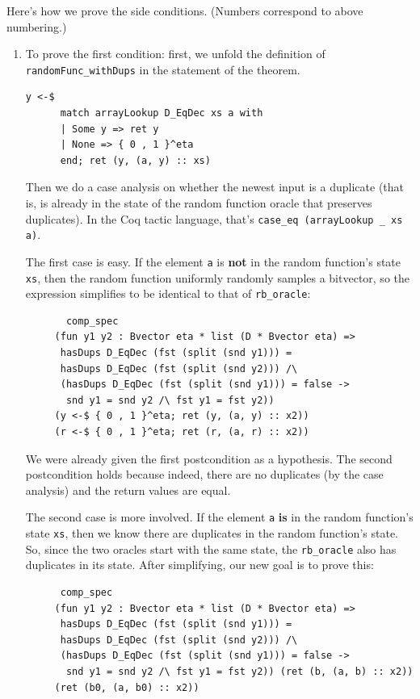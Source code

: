 \documentclass[12pt,lot, lof]{puthesis}
\newcommand{\li} {\lstinline}
\begin{document}
{Here's how we prove the side conditions. (Numbers correspond to above numbering.) 

\begin{enumerate}
\item To prove the first condition: first, we unfold the definition of \li|randomFunc_withDups| in the statement of the theorem.

\begin{lstlisting}
y <-$
      match arrayLookup D_EqDec xs a with
      | Some y => ret y
      | None => { 0 , 1 }^eta
      end; ret (y, (a, y) :: xs)
\end{lstlisting}      

Then we do a case analysis on whether the newest input is a duplicate (that is, is already in the state of the random function oracle that preserves duplicates). In the Coq tactic language, that's \li|case_eq (arrayLookup _ xs a)|.

	The first case is easy. If the element \li|a| is \textbf{not} in the random function's state \li|xs|, then the random function uniformly randomly samples a bitvector, so the expression simplifies to be identical to that of \li|rb_oracle|:
	
	\begin{lstlisting}
	   comp_spec
     (fun y1 y2 : Bvector eta * list (D * Bvector eta) =>
      hasDups D_EqDec (fst (split (snd y1))) =
      hasDups D_EqDec (fst (split (snd y2))) /\
      (hasDups D_EqDec (fst (split (snd y1))) = false ->
       snd y1 = snd y2 /\ fst y1 = fst y2))
     (y <-$ { 0 , 1 }^eta; ret (y, (a, y) :: x2))
     (r <-$ { 0 , 1 }^eta; ret (r, (a, r) :: x2))
     \end{lstlisting}
     
     We were already given the first postcondition as a hypothesis. The second postcondition holds because indeed, there are no duplicates (by the case analysis) and the return values are equal.

	The second case is more involved. If the element \li|a| \textbf{is} in the random function's state \li|xs|, then we know there are duplicates in the random function's state. So, since the two oracles start with the same state, the \li|rb_oracle| also has duplicates in its state. After simplifying, our new goal is to prove this:
	
	\begin{lstlisting}
	  comp_spec
     (fun y1 y2 : Bvector eta * list (D * Bvector eta) =>
      hasDups D_EqDec (fst (split (snd y1))) =
      hasDups D_EqDec (fst (split (snd y2))) /\
      (hasDups D_EqDec (fst (split (snd y1))) = false ->
       snd y1 = snd y2 /\ fst y1 = fst y2)) (ret (b, (a, b) :: x2))
     (ret (b0, (a, b0) :: x2))
     \end{lstlisting}
	

\end{enumerate}}
\end{document}
